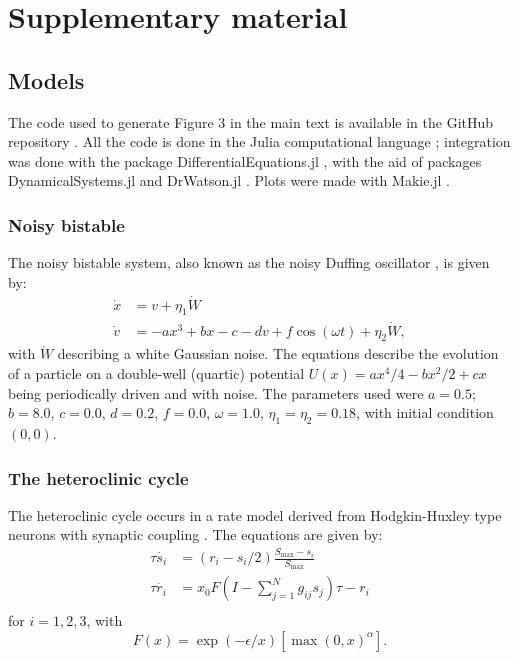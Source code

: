 \documentclass[reprint,superscriptaddress,showpacs,amsmath,amssymb,aps,floatfix,nolongbibliography]{revtex4-2}
\theoremstyle{definition}
\begin{document}
\section*{Supplementary material}
\subsection{Models}
The code used to generate Figure 3 in the main text is available in the GitHub repository \cite{rossi2022repository}. All the code is done in the Julia computational language \cite{bezanson2017julia}; integration was done with the package DifferentialEquations.jl \cite{rackauckas2016differential}, with the aid of packages DynamicalSystems.jl \cite{datseris2018dynamical} and DrWatson.jl \cite{datseris2020drwatson}. Plots were made with Makie.jl \cite{danisch2021makie}.

\subsubsection{Noisy bistable}
The noisy bistable system, also known as the noisy Duffing oscillator \cite{strogatz2002nonlinear}, is given by:
\begin{align}
    \dot{x} &= v + \eta_1 \dot{W}\\ 
    \dot{v} &= -ax^3 + bx -c -dv + f\cos(\omega t) + \eta_2 \dot{W},
\end{align}
with $\dot{W}$ describing a white Gaussian noise. The equations describe the evolution of a particle on a double-well (quartic) potential $U(x) = ax^4/4 -bx^2/2 +cx$ being periodically driven and with noise.
The parameters used were $a=0.5$; $b=8.0$, $c=0.0$, $d = 0.2$, $f = 0.0$, $\omega = 1.0$, $\eta_1= \eta_2 = 0.18$, with initial condition $(0, 0)$. 


\subsubsection{The heteroclinic cycle}
The heteroclinic cycle occurs in a rate model derived from Hodgkin-Huxley type neurons with synaptic coupling \cite{ashwin2011criteria}. The equations are given by:
\begin{align}
\tau\dot{s_i} &= \left( r_i - s_i/2 \right) \frac{S_\mathrm{max} - s_i}{S_\mathrm{max}} \\
\tau\dot{r_i} &= x_0 F\left( I - \sum_{j=1}^N g_{ij} s_j \right) \tau - r_i \\
\end{align}
for $i = 1, 2, 3$, with 
\begin{equation}
    F(x) = \exp(-\epsilon/x) [\max(0, x)^\alpha ]. 
\end{equation}
\end{document}
